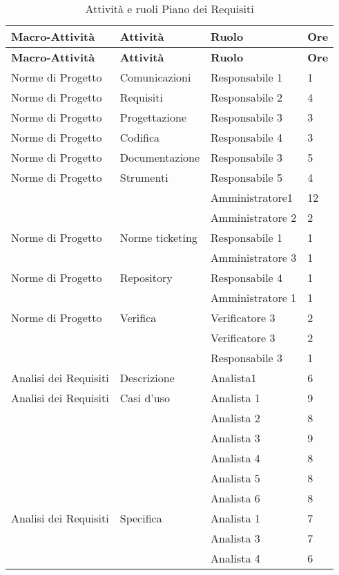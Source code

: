 {{	\renewcommand*{\arraystretch}{1.4}
	\begin{longtable} [c]{| l | l | l | l |}
		\caption{Attività e ruoli Piano dei Requisiti \label{tab:pianorequisiti}}\\
		 \hline
		 \textbf{Macro-Attività} & \textbf{Attività} & \textbf{Ruolo} & \textbf{Ore}\\
		 \hline
		 \endfirsthead
		 \hline
		 \textbf{Macro-Attività} & \textbf{Attività} & \textbf{Ruolo} & \textbf{Ore}\\
		 \hline
		\endhead
		 \hline
		 \endfoot
		 \hline
		 \endlastfoot
		Norme di Progetto & Comunicazioni & Responsabile 1 & 1\\
		Norme di Progetto & Requisiti & Responsabile 2 & 4\\
		Norme di Progetto & Progettazione & Responsabile 3 & 3\\
		Norme di Progetto & Codifica & Responsabile 4 & 3\\
		Norme di Progetto & Documentazione & Responsabile 3 & 5\\
		Norme di Progetto & Strumenti	&	Responsabile 5	&	4\\
		&	&	Amministratore1	&	12\\
		&	&	Amministratore 2	&	2\\
		Norme di Progetto & Norme ticketing &	Responsabile 1	&	1\\
		&	&	Amministratore 3 & 1\\
		Norme di Progetto & Repository &	Responsabile 4	&	1\\
		&	&	Amministratore 1	&	1\\
		Norme di Progetto & Verifica & Verificatore 3 & 2\\
		&	&	Verificatore 3 & 2\\
		&	&	Responsabile 3 & 1\\
		Analisi dei Requisiti & Descrizione & Analista1 & 6\\
		Analisi dei Requisiti & Casi d'uso & Analista 1 & 9\\
		&	&	Analista 2 & 8\\
		&	&	Analista 3 & 9\\
		&	&	Analista 4 & 8\\
		&	&	Analista 5 & 8\\
		&	&	Analista 6 & 8\\
		Analisi dei Requisiti & Specifica & Analista 1 & 7\\
		&	&	Analista 3 & 7\\
		&	&	Analista 4 & 6\\

\end{longtable}}}
